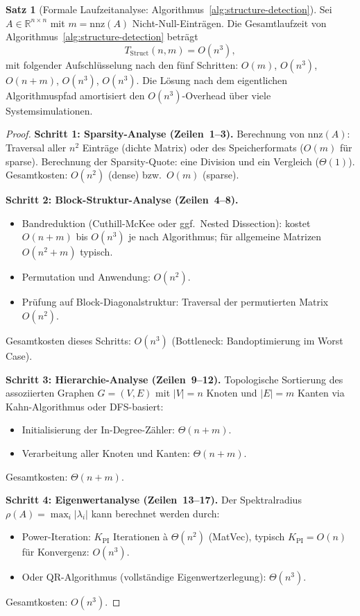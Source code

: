 \documentclass[a4paper,12pt]{report}
\theoremstyle{definition}
\newtheorem{satz}{Satz}
\begin{document}
	\begin{satz}[Formale Laufzeitanalyse: Algorithmus~\ref{alg:structure-detection}]
		\label{satz:laufzeit-structure-detection}
		Sei $A \in \mathbb{R}^{n \times n}$ mit $m = \mathrm{nnz}(A)$ Nicht-Null-Einträgen. Die Gesamtlaufzeit von Algorithmus~\ref{alg:structure-detection} beträgt
		\[
			T_{\mathrm{Struct}}(n, m) = O(n^3),
		\]
		mit folgender Aufschlüsselung nach den fünf Schritten: $O(m)$, $O(n^3)$, $O(n + m)$, $O(n^3)$, $O(n^3)$. Die Lösung nach dem eigentlichen Algorithmuspfad amortisiert den $O(n^3)$-Overhead über viele Systemsimulationen.
	\end{satz}
	\begin{proof}
		\textbf{Schritt 1: Sparsity-Analyse (Zeilen~1--3).}
		Berechnung von $\mathrm{nnz}(A)$: Traversal aller $n^2$ Einträge (dichte Matrix) oder des Speicherformats ($O(m)$ für sparse). Berechnung der Sparsity-Quote: eine Division und ein Vergleich ($\Theta(1)$). Gesamtkosten: $O(n^2)$ (dense) bzw.\ $O(m)$ (sparse).

		\textbf{Schritt 2: Block-Struktur-Analyse (Zeilen~4--8).}
		\begin{itemize}
			\item Bandreduktion (Cuthill-McKee oder ggf.\ Nested Dissection): kostet $O(n + m)$ bis $O(n^3)$ je nach Algorithmus; für allgemeine Matrizen $O(n^2 + m)$ typisch.
			\item Permutation und Anwendung: $O(n^2)$.
			\item Prüfung auf Block-Diagonalstruktur: Traversal der permutierten Matrix $O(n^2)$.
		\end{itemize}
		Gesamtkosten dieses Schritts: $O(n^3)$ (Bottleneck: Bandoptimierung im Worst Case).

		\textbf{Schritt 3: Hierarchie-Analyse (Zeilen~9--12).}
		Topologische Sortierung des assoziierten Graphen $G = (V, E)$ mit $|V| = n$ Knoten und $|E| = m$ Kanten via Kahn-Algorithmus oder DFS-basiert:
		\begin{itemize}
			\item Initialisierung der In-Degree-Zähler: $\Theta(n + m)$.
			\item Verarbeitung aller Knoten und Kanten: $\Theta(n + m)$.
		\end{itemize}
		Gesamtkosten: $\Theta(n + m)$.

		\textbf{Schritt 4: Eigenwertanalyse (Zeilen~13--17).}
		Der Spektralradius $\rho(A) = \max_i |\lambda_i|$ kann berechnet werden durch:
		\begin{itemize}
			\item Power-Iteration: $K_{\mathrm{PI}}$ Iterationen à $\Theta(n^2)$ (MatVec), typisch $K_{\mathrm{PI}} = O(n)$ für Konvergenz: $O(n^3)$.
			\item Oder QR-Algorithmus (vollständige Eigenwertzerlegung): $\Theta(n^3)$.
		\end{itemize}
		Gesamtkosten: $O(n^3)$.


\end{proof}
\end{document}
